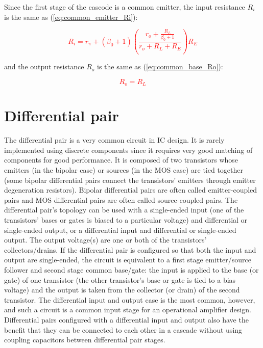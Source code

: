 \par
Since the first stage of the cascode is a common emitter, the input resistance $R_{i}$ is the same as (\ref{eq:common_emitter_Ri}):

\textcolor{red}{
\begin{equation}
R_{i} = r_{\pi} + (\beta_{0}+1)\left(\frac{r_{o} + \frac{R_{L}}{\beta_{0}+1}}{r_{o} + R_{L} + R_{E}}\right)R_{E}
\label{eq:cascode_Ri}
\end{equation}
}

\noindent and the output resistance $R_{o}$ is the same as (\ref{eq:common_base_Ro}):

\textcolor{red}{
\begin{equation}
R_{o} = R_{L}
\end{equation}
}



\section{Differential pair}
The differential pair is a very common circuit in IC design.
It is rarely implemented using discrete components since it requires very good matching of components for good performance.
It is composed of two transistors whose emitters (in the bipolar case) or sources (in the MOS case) are tied together (some bipolar differential pairs connect the transistors' emitters through emitter degeneration resistors).
Bipolar differential pairs are often called emitter-coupled pairs and MOS differential pairs are often called source-coupled pairs.
The differential pair's topology can be used with a single-ended input (one of the transistors' bases or gates is biased to a particular voltage) and differential or single-ended output, or a differential input and differential or single-ended output.
The output voltage(s) are one or both of the transistors' collectors/drains.
If the differential pair is configured so that both the input and output are single-ended, the circuit is equivalent to a first stage emitter/source follower and second stage common base/gate:
the input is applied to the base (or gate) of one transistor (the other transistor's base or gate is tied to a bias voltage) and the output is taken from the collector (or drain) of the second transistor.
The differential input and output case is the most common, however, and such a circuit is a common input stage for an operational amplifier design.
Differential pairs configured with a differential input and output also have the benefit that they can be connected to each other in a cascade without using coupling capacitors between differential pair stages. \autocite[215]{analysis-design-analog-ics}

